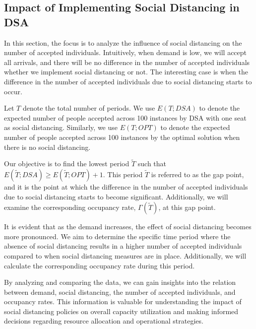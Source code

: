 \subsection{Impact of Implementing Social Distancing in DSA}
In this section, the focus is to analyze the influence of social distancing on the number of accepted individuals. Intuitively, when demand is low, we will accept all arrivals, and there will be no difference in the number of accepted individuals whether we implement social distancing or not. The interesting case is when the difference in the number of accepted individuals due to social distancing starts to occur.

Let $T$ denote the total number of periods. We use $E(T; DSA)$ to denote the expected number of people accepted across 100 instances by DSA with one seat as social distancing. Similarly, we use $E(T; OPT)$ to denote the expected number of people accepted across 100 instances by the optimal solution when there is no social distancing.

Our objective is to find the lowest period $\tilde{T}$ such that $E(\tilde{T}; DSA) \geq E(\tilde{T}; OPT) + 1$. This period $\tilde{T}$ is referred to as the gap point, and it is the point at which the difference in the number of accepted individuals due to social distancing starts to become significant.
Additionally, we will examine the corresponding occupancy rate, $\Gamma(\tilde{T})$, at this gap point. 




It is evident that as the demand increases, the effect of social distancing becomes more pronounced. We aim to determine the specific time period where the absence of social distancing results in a higher number of accepted individuals compared to when social distancing measures are in place. Additionally, we will calculate the corresponding occupancy rate during this period.

By analyzing and comparing the data, we can gain insights into the relation between demand, social distancing, the number of accepted individuals, and occupancy rates. This information is valuable for understanding the impact of social distancing policies on overall capacity utilization and making informed decisions regarding resource allocation and operational strategies.

